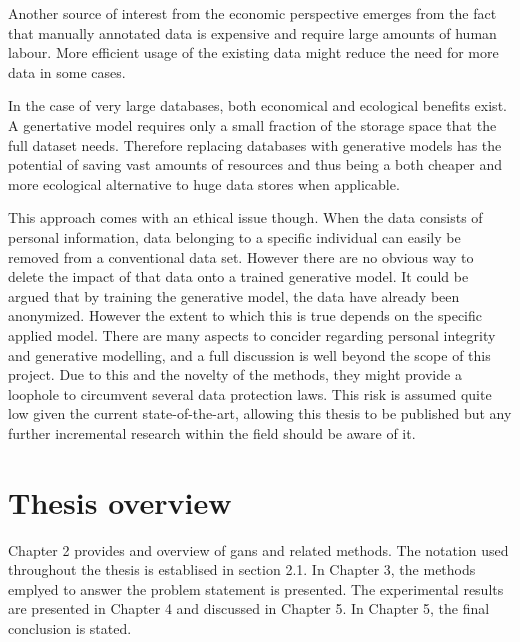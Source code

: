 Another source of interest from the economic perspective emerges from the fact that manually annotated data is expensive and require large amounts of human labour. More efficient usage of the existing data might reduce the need for more data in some cases. 

In the case of very large databases, both economical and ecological benefits exist. A genertative model requires only a small fraction of the storage space that the full dataset needs. Therefore replacing databases with generative models has the potential of saving vast amounts of resources and thus being a both cheaper and more ecological alternative to huge data stores when applicable.  

This approach comes with an ethical issue though. When the data consists of personal information, data belonging to a specific individual can easily be removed from a conventional data set. However there are no obvious way to delete the impact of that data onto a trained generative model. It could be argued that by training the generative model, the data have already been anonymized. However the extent to which this is true depends on the specific applied model. There are many aspects to concider regarding personal integrity and generative modelling, and a full discussion is well beyond the scope of this project. Due to this and the novelty of the methods, they might provide a loophole to circumvent several data protection laws. This risk is assumed quite low given the current state-of-the-art, allowing this thesis to be published but any further incremental research within the field should be aware of it.

\section{Thesis overview}
Chapter 2 provides and overview of \acrlong{gans} and related methods. The notation used throughout the thesis is establised in section 2.1. In Chapter 3, the methods emplyed to answer the problem statement is presented. The experimental results are presented in Chapter 4 and discussed in Chapter 5. In Chapter 5, the final conclusion is stated.




